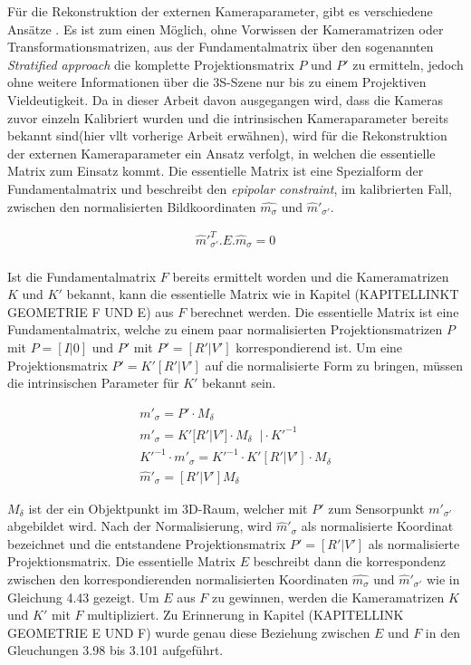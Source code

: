 Für die Rekonstruktion der externen Kameraparameter, gibt es verschiedene Ansätze \cite{HZ}. Es ist zum einen Möglich, ohne Vorwissen der Kameramatrizen oder Transformationsmatrizen, aus der Fundamentalmatrix über den sogenannten \textit{Stratified approach} die komplette Projektionsmatrix $P$ und $P'$ zu ermitteln, jedoch ohne weitere Informationen über die 3S-Szene nur bis zu einem Projektiven Vieldeutigkeit\cite{HZ}. Da in dieser Arbeit davon ausgegangen wird, dass die Kameras zuvor einzeln Kalibriert wurden und die intrinsischen Kameraparameter bereits bekannt sind(hier vllt vorherige Arbeit erwähnen), wird für die Rekonstruktion der externen Kameraparameter ein Ansatz verfolgt, in welchen die essentielle Matrix zum Einsatz kommt. Die essentielle Matrix ist eine Spezialform der Fundamentalmatrix und beschreibt den \textit{epipolar constraint}, im  kalibrierten Fall, zwischen den normalisierten Bildkoordinaten $\hat{m_\sigma}$ und $\hat{m}'_{\sigma'}$\cite{HZ,Elements,ZZGXr,Zhang2014,Ferid}. 


\begin{gather}
\hat{m}'^T_{\sigma'}.E.\hat{m}_\sigma = 0
\end{gather}\\ 

Ist die Fundamentalmatrix $F$ bereits ermittelt worden und die Kameramatrizen $K$ und $K'$ bekannt, kann die essentielle Matrix wie in Kapitel (KAPITELLINKT GEOMETRIE F UND E) aus $F$ berechnet werden. Die essentielle Matrix ist eine Fundamentalmatrix, welche zu einem paar normalisierten Projektionsmatrizen $P$ mit $P = [I|0]$ und $P'$ mit $P'= [R'|V']$ korrespondierend ist\cite{HZ,Zhang2014,ZZGXr,Ferid}. Um eine Projektionsmatrix $P'=K'[R'|V']$ auf die normalisierte Form zu bringen, müssen die intrinsischen Parameter für $K'$ bekannt sein. 

\begin{gather}
	m'_{\sigma} = P' \cdot M_\delta\\
	m'_{\sigma} = K'[R'|V'] \cdot M_\delta\;\; | \cdot K'^{-1}\\
	K'^{-1} \cdot m'_{\sigma} = K'^{-1} \cdot K'[R'|V'] \cdot M_\delta\\
	\hat{m}'_{\sigma} = [R'|V'] M_\delta
\end{gather}

$M_\delta$ ist der ein Objektpunkt im 3D-Raum, welcher mit $P'$ zum Sensorpunkt $m'_{\sigma'}$ abgebildet wird. Nach der Normalisierung, wird $\hat{m}'_{\sigma}$ als normalisierte Koordinat bezeichnet und die entstandene Projektionsmatrix $P' = [R'|V']$ als normalisierte Projektionsmatrix\cite{HZ,Ferid}. Die essentielle Matrix $E$ beschreibt dann die korrespondenz zwischen den korrespondierenden normalisierten Koordinaten  $\hat{m_\sigma}$ und $\hat{m}'_{\sigma'}$ wie in Gleichung 4.43 gezeigt. Um $E$ aus $F$ zu gewinnen, werden die Kameramatrizen $K$ und $K'$ mit $F$ multipliziert. Zu Erinnerung in Kapitel (KAPITELLINK GEOMETRIE E UND F) wurde genau diese Beziehung zwischen $E$ und $F$ in den Gleuchungen 3.98 bis 3.101 aufgeführt. 


